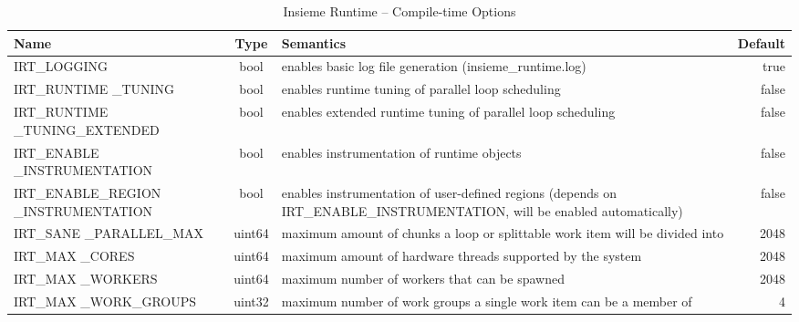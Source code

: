\begin{table}[htbp] \small
	\centering
    \begin{tabular}{|p{4cm}|c|p{6cm}|r|}
        \hline
        Name                              & Type   & Semantics                                                                      & Default \\ \hline \hline
        IRT\_LOGGING                       & bool   & enables basic log file generation (insieme\_runtime.log)                                                                & true          \\ \hline
        IRT\_RUNTIME \_TUNING                & bool   & enables runtime tuning of parallel loop scheduling                                                                     & false         \\ \hline
        IRT\_RUNTIME \_TUNING\_EXTENDED       & bool   & enables extended runtime tuning of parallel loop scheduling                                                            & false         \\ \hline
        IRT\_ENABLE \_INSTRUMENTATION        & bool   & enables instrumentation of runtime objects                                                                             & false         \\ \hline
        IRT\_ENABLE\_REGION \_INSTRUMENTATION & bool   & enables instrumentation of user-defined regions (depends on IRT\_ENABLE\_INSTRUMENTATION, will be enabled automatically) & false         \\ \hline
        IRT\_SANE \_PARALLEL\_MAX             & uint64 & maximum amount of chunks a loop or splittable work item will be divided into                                           & 2048          \\ \hline
        IRT\_MAX \_CORES                     & uint64 & maximum amount of hardware threads supported by the system                                                             & 2048          \\ \hline
        IRT\_MAX \_WORKERS                   & uint64 & maximum number of workers that can be spawned                                                                          & 2048          \\ \hline
        IRT\_MAX \_WORK\_GROUPS               & uint32 & maximum number of work groups a single work item can be a member of                                                    & 4             \\ \hline
  \end{tabular}
	\caption{Insieme Runtime -- Compile-time Options}
	\label{tab:runtime:options:compile}
\end{table}

